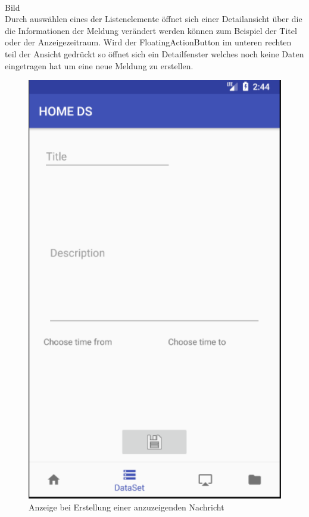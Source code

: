 \\
Bild 
\\
Durch auswählen eines der Listenelemente öffnet sich einer Detailansicht über die die Informationen der Meldung verändert werden können zum Beispiel der Titel oder der Anzeigezeitraum. Wird der FloatingActionButton im unteren rechten teil der Ansicht gedrückt so öffnet sich ein Detailfenster welches noch keine Daten eingetragen hat um eine neue Meldung zu erstellen.
\begin{figure}[H]
\centering
\includegraphics[width=1.0\textwidth]{images/06_AndroidApp/06_NewNewsEdit}
\caption{Anzeige bei Erstellung einer anzuzeigenden Nachricht}
\label{fig:mediaNav}
\end{figure}

